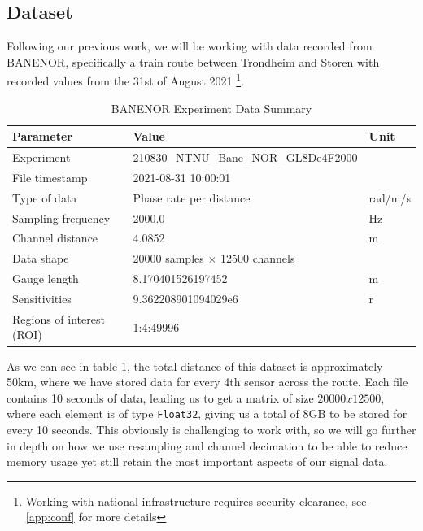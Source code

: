 \subsection{Dataset}

Following our previous work, we will be working with data recorded from BANENOR, specifically a train route between Trondheim and Storen with recorded values from the 31st of August 2021 \footnote{Working with national infrastructure requires security clearance, see \ref{app:conf} for more details}. 

\begin{table}[!htbp]
    \centering
    \small
    \begin{tabular}{@{}p{}p{}p{}@{}}
        \toprule
        \textbf{Parameter} & \textbf{Value} & \textbf{Unit} \\
        \midrule
        Experiment & 210830\_NTNU\_Bane\_NOR\_GL8De4F2000 & \\
        File timestamp & 2021-08-31 10:00:01 & \\
        Type of data & Phase rate per distance & rad/m/s \\
        Sampling frequency & 2000.0 & \si{\hertz} \\
        Channel distance & 4.0852 & \si{\meter} \\
        \midrule
        Data shape & 20000 samples \(\times\) 12500 channels & \\
        \midrule
        Gauge length & 8.170401526197452 & \si{\meter} \\
        Sensitivities & 9.362208901094029e6 & r \\
        Regions of interest (ROI) & 1:4:49996 & \\
        \bottomrule
    \end{tabular}
    \caption{BANENOR Experiment Data Summary}
    \label{tab:experiment_data}
\end{table}

As we can see in table \ref{tab:experiment_data}, the total distance of this dataset is approximately 50km, where we have stored data for every 4th sensor across the route. Each file contains 10 seconds of data, leading us to get a matrix of size $20000 x 12500$, where each element is of type \texttt{Float32}, giving us a total of 8GB to be stored for every 10 seconds. This obviously is challenging to work with, so we will go further in depth on how we use resampling and channel decimation to be able to reduce memory usage yet still retain the most important aspects of our signal data. \\


